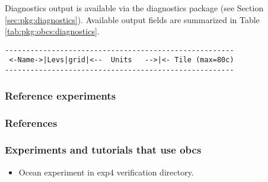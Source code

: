 Diagnostics output is available via the diagnostics package
(see Section \ref{sec:pkg:diagnostics}).
Available output fields are summarized in 
Table \ref{tab:pkg:obcs:diagnostics}.

\begin{table}[h!]
\centering
\label{tab:pkg:obcs:diagnostics}
{\footnotesize
\begin{verbatim}
------------------------------------------------------
 <-Name->|Levs|grid|<--  Units   -->|<- Tile (max=80c)
------------------------------------------------------

\end{verbatim}
}
\caption{~}
\end{table}


\subsubsection{Reference experiments}




\subsubsection{References}

\subsubsection{Experiments and tutorials that use obcs}
\label{sec:pkg:obcs:experiments}

\begin{itemize}
\item{Ocean experiment in exp4 verification directory. }
\end{itemize}

